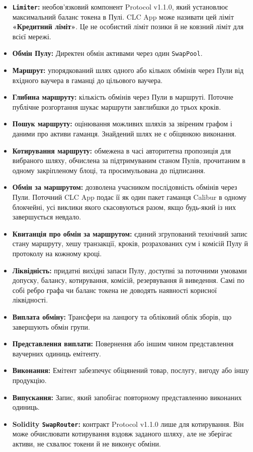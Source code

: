 \documentclass[11pt]{article}
\begin{document}
\begin{itemize}[leftmargin=*]
\item \textbf{\texttt{Limiter}:} необов'язковий компонент Protocol v1.1.0, який установлює максимальний баланс токена в Пулі. CLC App може називати цей ліміт \textbf{«Кредитний ліміт»}. Це не особистий ліміт позики й не ковзний ліміт для всієї мережі.
\item \textbf{Обмін Пулу:} Директен обмін активами через один \texttt{SwapPool}.
\item \textbf{Маршрут:} упорядкований шлях одного або кількох обмінів через Пули від вхідного ваучера в гаманці до цільового ваучера.
\item \textbf{Глибина маршруту:} кількість обмінів через Пули в маршруті. Поточне публічне розгортання шукає маршрути завглибшки до трьох кроків.
\item \textbf{Пошук маршруту:} оцінювання можливих шляхів за звіреним графом і даними про активи гаманця. Знайдений шлях не є обіцянкою виконання.
\item \textbf{Котирування маршруту:} обмежена в часі авторитетна пропозиція для вибраного шляху, обчислена за підтримуваним станом Пулів, прочитаним в одному закріпленому блоці, та просимульована до підписання.
\item \textbf{Обмін за маршрутом:} дозволена учасником послідовність обмінів через Пули. Поточний CLC App подає її як один пакет гаманця Calibur в одному блокчейні, усі виклики якого скасовуються разом, якщо будь-який із них завершується невдало.
\item \textbf{Квитанція про обмін за маршрутом:} єдиний згрупований технічний запис стану маршруту, хешу транзакції, кроків, розрахованих сум і комісій Пулу й протоколу на кожному кроці.
\item \textbf{Ліквідність:} придатні вихідні запаси Пулу, доступні за поточними умовами допуску, балансу, котирування, комісій, резервування й виведення. Самі по собі ребро графа чи баланс токена не доводять наявності корисної ліквідності.
\item \textbf{Виплата обміну:} Трансфери на ланцюгу та обліковий облік зборів, що завершують обмін групи.
\item \textbf{Представлення виплати:} Повернення або іншим чином представлення ваучерних одиниць емітенту.
\item \textbf{Виконання:} Емітент забезпечує обіцянений товар, послугу, вигоду або іншу продукцію.
\item \textbf{Випускання:} Запис, який запобігає повторному представленню виконаних одиниць.
\item \textbf{Solidity \texttt{SwapRouter}:} контракт Protocol v1.1.0 лише для котирування. Він може обчислювати котирування вздовж заданого шляху, але не зберігає активи, не схвалює токени й не виконує обміни.

\end{itemize}
\end{document}
